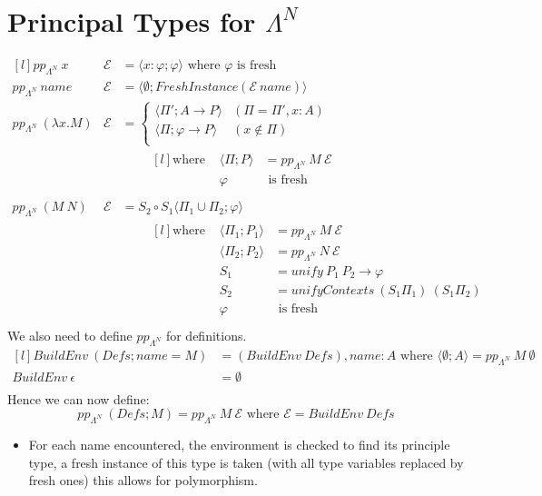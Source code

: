 \section{Principal Types for $\Lambda^N$}
\[\begin{matrix*}[l]
		pp_{\Lambda^N} \ x & \mathcal{E} & = \langle x: \varphi ; \varphi \rangle \text{ where } \varphi \text{ is fresh} \\
		pp_{\Lambda^N} \ name & \mathcal{E} & = \langle \emptyset ; FreshInstance(\mathcal{E} \ name) \rangle \\
		pp_{\Lambda^N} \ (\lambda x . M) & \mathcal{E} & = \begin{cases}
			\langle \Pi'; A \to P \rangle      & (\Pi = \Pi', x:A) \\
			\langle \Pi; \varphi \to P \rangle & (x \not\in \Pi)   \\
		\end{cases} \\
		& & \qquad \begin{matrix*}[l]
			\text{where } & \langle \Pi; P \rangle & = pp_{\Lambda^N} \ M \ \mathcal{E} \\
			& \varphi & \text{ is fresh} \\
		\end{matrix*} \\
		pp_{\Lambda^N} \ (M \ N) & \mathcal{E} & = S_2 \circ S_1 \langle \Pi_1 \cup \Pi_2 ; \varphi \rangle \\
		& & \qquad \begin{matrix*}[l]
			\text{where } & \langle \Pi_1 ; P_1 \rangle & = pp_{\Lambda^N} \ M \ \mathcal{E} \\
			& \langle \Pi_2 ; P_2 \rangle & = pp_{\Lambda^N} \ N \ \mathcal{E} \\
			& S_1 & = unify \ P_1 \ P_2 \to \varphi \\
			& S_2 & = unifyContexts \ (S_1 \Pi_1) \ (S_1 \Pi_2) \\
			& \varphi & \text{ is fresh} \\
		\end{matrix*}
	\end{matrix*}\]
We also need to define $pp_{\Lambda^N}$ for definitions.
\[\begin{matrix*}[l]
		BuildEnv \ (Defs ; name = M) & = (BuildEnv \ Defs), name:A \text{ where } \langle \emptyset; A \rangle = pp_{\Lambda^N} \ M \ \emptyset \\
		BuildEnv \ \epsilon & = \emptyset \\
	\end{matrix*}\]
Hence we can now define:
\[pp_{\Lambda^N} \ (Defs; M) = pp_{\Lambda^N} \ M \ \mathcal{E} \text{ where } \mathcal{E} = BuildEnv \ Defs\]
\begin{itemize}
	\item For each name encountered, the environment is checked to find its principle type, a fresh instance of this type is taken (with all type variables replaced by fresh ones) this allows for polymorphism.
\end{itemize}

